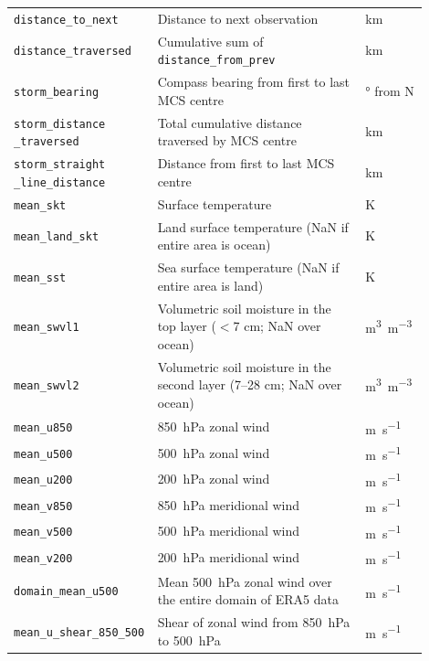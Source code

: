 {\begin{longtable}{>{\raggedright\arraybackslash}p{0.25\linewidth} p{0.50\linewidth} >{\raggedright\arraybackslash}p{0.15\linewidth}}
    \texttt{distance\_to\_next} & Distance to next observation & \unit{\km} \\
    \texttt{distance\_traversed} & Cumulative sum of \texttt{distance\_from\_prev} & \unit{\km} \\
    \texttt{storm\_bearing} & Compass bearing from first to last MCS centre & \unit{\degree} from  N \\
    \texttt{storm\_distance \_traversed} & Total cumulative distance traversed by MCS centre & \unit{\km} \\
    \texttt{storm\_straight \_line\_distance} & Distance from first to last MCS centre & \unit{\km} \\
    \texttt{mean\_skt} & Surface temperature & \unit{\kelvin} \\
    \texttt{mean\_land\_skt} & Land surface temperature (NaN if entire area is ocean) & \unit{\kelvin} \\
    \texttt{mean\_sst} & Sea surface temperature (NaN if entire area is land) & \unit{\kelvin} \\
    \texttt{mean\_swvl1} & Volumetric soil moisture in the top layer ($<$7 cm; NaN over ocean) & \unit{\meter\cubed\per\meter\cubed} \\
    \texttt{mean\_swvl2} & Volumetric soil moisture in the second layer (7--28 cm; NaN over ocean) & \unit{\meter\cubed\per\meter\cubed} \\
    \texttt{mean\_u850} & \SI{850}{\hecto\pascal} zonal wind & \unit{\meter\per\second} \\
    \texttt{mean\_u500} & \SI{500}{\hecto\pascal} zonal wind & \unit{\meter\per\second} \\
    \texttt{mean\_u200} & \SI{200}{\hecto\pascal} zonal wind & \unit{\meter\per\second} \\
    \texttt{mean\_v850} & \SI{850}{\hecto\pascal} meridional wind & \unit{\meter\per\second} \\
    \texttt{mean\_v500} & \SI{500}{\hecto\pascal} meridional wind & \unit{\meter\per\second} \\
    \texttt{mean\_v200} & \SI{200}{\hecto\pascal} meridional wind & \unit{\meter\per\second} \\
    \texttt{domain\_mean\_u500} & Mean \SI{500}{\hecto\pascal} zonal wind over the entire domain of ERA5 data & \unit{\meter\per\second} \\
    \texttt{mean\_u\_shear\_850\_500} & Shear of zonal wind from \SI{850}{\hecto\pascal} to \SI{500}{\hecto\pascal} & \unit{\meter\per\second} \\

\end{longtable}}
